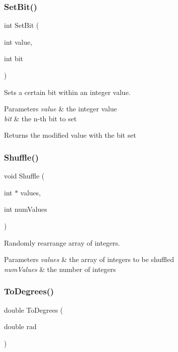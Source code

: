 \subsubsection{\texorpdfstring{Set\+Bit()}{SetBit()}}
{\footnotesize\ttfamily int Set\+Bit (\begin{DoxyParamCaption}\item[{int}]{value,  }\item[{int}]{bit }\end{DoxyParamCaption})}

Sets a certain bit within an integer value.


\begin{DoxyParams}{Parameters}
{\em value} & the integer value \\
\hline
{\em bit} & the n-\/th bit to set \\
\hline
\end{DoxyParams}
\begin{DoxyReturn}{Returns}
the modified value with the bit set 
\end{DoxyReturn}
\mbox{\label{group__math__group_ga9dffb844db4ac8823c6c957448576ed8}} 
\subsubsection{\texorpdfstring{Shuffle()}{Shuffle()}}
{\footnotesize\ttfamily void Shuffle (\begin{DoxyParamCaption}\item[{int $\ast$}]{values,  }\item[{int}]{num\+Values }\end{DoxyParamCaption})}

Randomly rearrange array of integers.


\begin{DoxyParams}{Parameters}
{\em values} & the array of integers to be shuffled \\
\hline
{\em num\+Values} & the number of integers \\
\hline
\end{DoxyParams}
\mbox{\label{group__math__group_gab6efcc6e24e777db0fe5e0d0955c2b2d}} 
\subsubsection{\texorpdfstring{To\+Degrees()}{ToDegrees()}}
{\footnotesize\ttfamily double To\+Degrees (\begin{DoxyParamCaption}\item[{double}]{rad }\end{DoxyParamCaption})}

